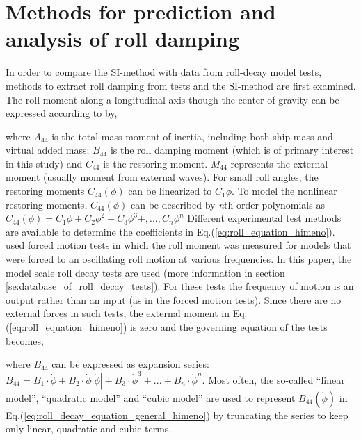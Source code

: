 \section{Methods for prediction and analysis of roll damping}
\label{se:methods_for_prediction_and_analysis}
In order to compare the SI-method with data from roll-decay model tests, methods to extract roll damping from tests and the SI-method are first examined. The roll moment along a longitudinal axis though the center of gravity can be expressed according to  \parencite{himeno_prediction_1981} by,

 

where $A_{44}$ is the total mass moment of inertia, including both ship mass and virtual added mass; $B_{44}$ is the roll damping moment (which is of primary interest in this study) and $C_{44}$ is the restoring moment. $M_{44}$ represents the external moment (usually moment from external waves). For small roll angles, the restoring moments $C_{44}(\phi)$ can be linearized to $C_{1}\phi$. To model the nonlinear restoring moments, $C_{44}(\phi)$ can be described by \emph{n}th order polynomials as $C_{44}(\phi) = C_{1}\phi + C_{2}\phi^2 + C_{3}\phi^3 +, ..., C_{n}\phi^n $
Different experimental test methods are available to determine the coefficients in Eq.(\ref{eq:roll_equation_himeno}). \parencite{ikeda_components_1978} used forced motion tests in which the roll moment was measured for models that were forced to an oscillating roll motion at various frequencies. In this paper, the model scale roll decay tests are used (more information in section \ref{se:database_of_roll_decay_tests}). For these tests the frequency of motion is an output rather than an input (as in the forced motion tests).  Since there are no external forces in such tests, the external moment in Eq.(\ref{eq:roll_equation_himeno}) is zero and the governing equation of the tests becomes, 




where $B_{44}$ can be expressed as expansion series:  
$ B_{44} = B_1\cdot\dot{\phi} + B_2\cdot\dot{\phi}\left|\dot{\phi}\right| + B_3\cdot\dot{\phi}^3 + ... + B_n\cdot\dot{\phi}^n$. Most often, the so-called ``linear model'', ``quadratic model'' and ``cubic model'' are used to represent $B_{44}(\dot{\phi})$ in Eq.(\ref{eq:roll_decay_equation_general_himeno}) by truncating the series to keep only linear, quadratic and cubic terms,

